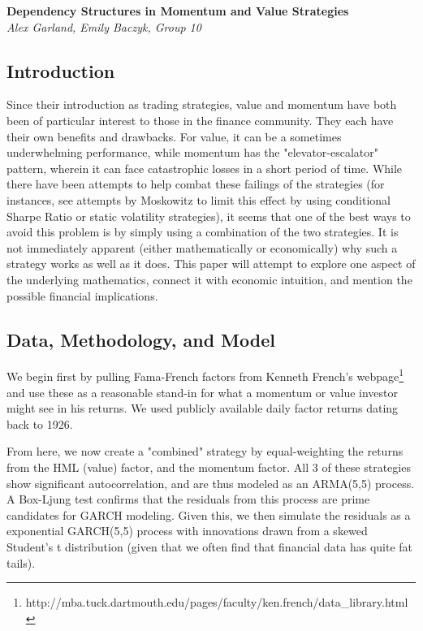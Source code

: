 \documentclass[11pt,letterpaper]{memoir}
\begin{document}
    \vspace*{-50pt}
    \begin{center}
    	\textbf{{\large Dependency Structures in Momentum and Value Strategies}}
    	\\
    	\textit{Alex Garland, Emily Baczyk, Group 10}
    \end{center}
    
\subsection*{Introduction}
Since their introduction as trading strategies, value and momentum have both been of particular interest to those in the finance community. They each have their own benefits and drawbacks. For value, it can be a sometimes underwhelming performance, while momentum has the "elevator-escalator" pattern, wherein it can face catastrophic losses in a short period of time. While there have been attempts to help combat these failings of the strategies (for instances, see attempts by Moskowitz to limit this effect by using conditional Sharpe Ratio or static volatility strategies), it seems that one of the best ways to avoid this problem is by simply using a combination of the two strategies. It is not immediately apparent (either mathematically or economically) why such a strategy works as well as it does. This paper will attempt to explore one aspect of the underlying mathematics, connect it with economic intuition, and mention the possible financial implications.

\subsection*{Data, Methodology, and Model}
We begin first by pulling Fama-French factors from Kenneth French's webpage\footnote{http://mba.tuck.dartmouth.edu/pages/faculty/ken.french/data_library.html} and use these as a reasonable stand-in for what a momentum or value investor might see in his returns. We used publicly available daily factor returns dating back to 1926.

From here, we now create a "combined" strategy by equal-weighting the returns from the HML (value) factor, and the momentum factor. All 3 of these strategies show significant autocorrelation, and are thus modeled as an ARMA(5,5) process. A Box-Ljung test confirms that the residuals from this process are prime candidates for GARCH modeling. Given this, we then simulate the residuals as a exponential GARCH(5,5) process with innovations drawn from a skewed Student's t distribution (given that we often find that financial data has quite fat tails).
\end{document}
